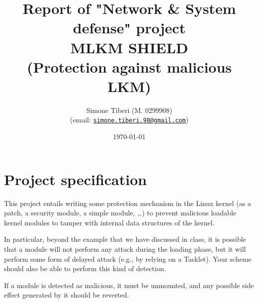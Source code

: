 \documentclass{article}
\title{\small Report of "Network \& System defense" project \\
\Huge \textbf{MLKM SHIELD}\\
\Large (Protection against malicious LKM)}
\author{Simone Tiberi (M. 0299908)\\%
(email: \texttt{\href{mailto:simone.tiberi.98@gmail.com}{simone.tiberi.98@gmail.com}})}
\date{\today}
\begin{document}
\maketitle

\section{Project specification}
This project entails writing some protection mechanism in the Linux kernel (as a patch, a security
module, a simple module, \dots) to prevent malicious loadable kernel modules to tamper with
internal data structures of the kernel.

In particular, beyond the example that we have discussed in class, it is possible that a module will
not perform any attack during the loading phase, but it will perform some form of delayed attack
(e.g., by relying on a Tasklet). Your scheme should also be able to perform this kind of detection.

If a module is detected as malicious, it must be unmounted, and any possible side effect
generated by it should be reverted.

\newpage


\end{document}

